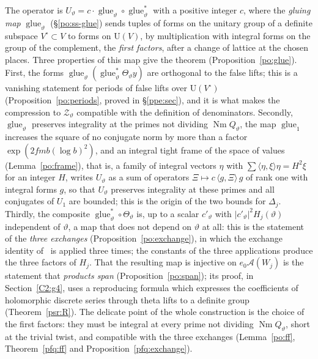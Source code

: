 \documentclass[10pt]{amsart}
\theoremstyle{definition}
\theoremstyle{remark}
\begin{document}
The operator is $U_\vartheta=c\cdot\operatorname{glue}_\vartheta\circ\operatorname{glue}_\vartheta^*$
with a positive integer $c$, where the \emph{gluing map} $\operatorname{glue}_\vartheta$
(\S\ref{po:ss-glue}) sends tuples of forms on the unitary group of a definite subspace
$V^\circ\subset V$ to forms on $\mathrm U(V)$, by multiplication with integral forms on the group of the
complement, the \emph{first factors}, after a change of lattice at the chosen places. Three properties of this map give the theorem
(Proposition~\ref{po:glue}). First, the forms $\operatorname{glue}_\vartheta(\operatorname{glue}_\vartheta^*\Theta_\vartheta y)$
are orthogonal to the false lifts; this is a vanishing statement for periods of false lifts over
$\mathrm U(V^\circ)$ (Proposition~\ref{po:periods}, proved in \S\ref{ppe:sec}), and it is
what makes the compression to $\mathcal Z_\vartheta$ compatible with the definition of
denominators. Secondly, $\operatorname{glue}_\vartheta$ preserves integrality at the primes not dividing
$\operatorname{Nm}Q_\vartheta$, the map $\operatorname{glue}_1$ increases the square of no
conjugate norm by more than a factor $\exp(2fmb(\log b)^2)$, and an integral tight frame of the
space of values (Lemma~\ref{po:frame}), that is, a family of integral vectors $\eta$ with
$\sum\langle\eta,\xi\rangle\eta=H^2\xi$ for an integer $H$, writes $U_\vartheta$ as a sum of
operators $\Xi\mapsto c\,\langle g,\Xi\rangle\,g$ of rank one with integral forms $g$, so that $U_\vartheta$ preserves integrality at
these primes and all conjugates of $U_1$ are bounded; this is the origin of
the two bounds for $\Delta_j$. Thirdly, the composite
$\operatorname{glue}_\vartheta^*\circ\Theta_\vartheta$ is, up to a scalar $c'_\vartheta$ with
$|c'_\vartheta|^2H_j(\vartheta)$ independent of $\vartheta$, a map that does not depend on
$\vartheta$ at all: this is the statement of the \emph{three exchanges}
(Proposition~\ref{po:exchange}), in which the exchange identity of~\cite{P53} is applied three
times; the constants of the three applications produce the three factors of $H_j$. That the resulting map is injective on $e_0\mathcal A(W_j)$ is the statement that
\emph{products span} (Proposition~\ref{po:span}); its proof, in
Section~\ref{C2:g4}, uses a reproducing formula which expresses the
coefficients of holomorphic discrete series through theta lifts to a definite group
(Theorem~\ref{psr:R}). The delicate point of the whole construction is the choice of the first
factors: they must be integral at every prime not dividing $\operatorname{Nm}Q_\vartheta$,
short at the trivial twist, and compatible with the three exchanges
(Lemma~\ref{po:ff}, Theorem~\ref{pfq:ff} and Proposition~\ref{pfq:exchange}).
\end{document}
